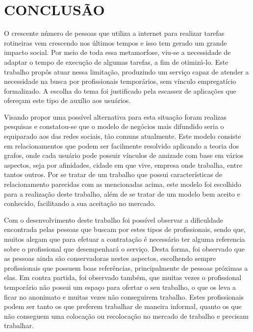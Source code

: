 \chapter{CONCLUSÃO} 


\par O crescente número de pessoas que utiliza a internet para realizar tarefas rotineiras vem crescendo nos últimos tempos e isso tem gerado um grande impacto social. Por meio de toda essa metamorfose, viu-se a necessidade de adaptar o tempo de execução de algumas tarefas, a fim de otimizá-lo.  Este trabalho propôs atuar nessa limitação, produzindo um serviço capaz de atender a necessidade na busca por profissionais temporários, sem vínculo empregatício formalizado. A escolha do tema foi justificado pela escassez de aplicações que ofereçam este tipo de auxílio aos usuários.

\par Visando propor uma possível alternativa para esta situação foram realizas pesquisas e constatou-se que o modelo de negócios mais difundido seria o equiparado aos das redes sociais, tão comuns atualmente. Este modelo consiste em relacionamentos que podem ser facilmente resolvido aplicando a teoria dos grafos, onde cada usuário pode possuir vínculos de amizade com base em vários aspectos, seja por afinidades, cidade em que vive, empresa onde trabalha, entre tantos outros. Por se tratar de um trabalho que possui características de relacionamento parecidas com as mencionadas acima, este modelo foi escolhido para a realização deste trabalho, além de se tratar de um modelo bem aceito e conhecido, facilitando a sua aceitação no mercado.

\par Com o desenvolvimento deste trabalho foi possível observar a dificuldade encontrada pelas pessoas que buscam por estes tipos de profissionais, sendo que, muitos alegam que para efetuar a contratação é necessário ter alguma referencia sobre o profissional que desempenhará o serviço. Desta forma, foi observado que as pessoas ainda são conservadoras nestes aspectos, escolhendo sempre profissionais que possuem boas referências, principalmente de pessoas próximas a elas. Em contra partida, foi observado também, que muitas vezes o profissional temporário não possui um espaço para ofertar o seu trabalho, o que os leva a ficar no anonimato e muitas vezes não conseguirem trabalho. Estes profissionais podem ser tanto os que preferem trabalhar de maneira informal, quanto os que não conseguem uma colocação ou recolocação no mercado de trabalho e precisam trabalhar.


